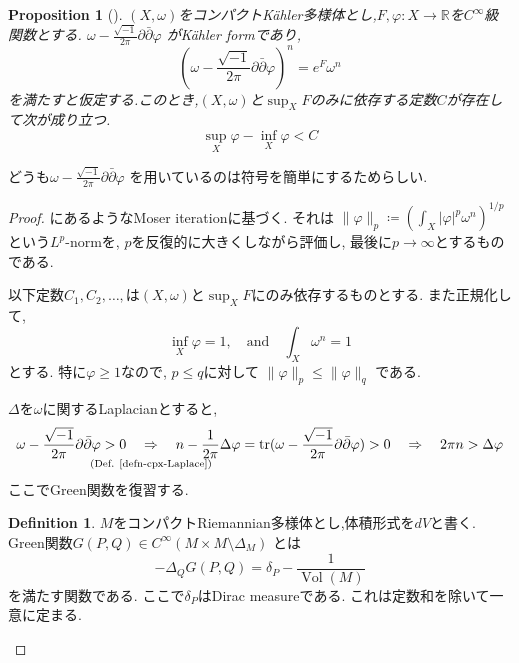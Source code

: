 \documentclass[dvipdfmx,a4paper,11pt]{article} %
\newtheorem{prop}[thm]{Proposition}
\theoremstyle{definition}
\newtheorem{defn}[thm]{Definition}
\theoremstyle{remark}
\numberwithin{equation}{section}
\DeclareMathOperator{\Vol}{Vol}
\newcommand{\underalign}[2]{%
  \quad
  \underset{\mathclap{\raisebox{-1.6ex}{\ensuremath{\scriptstyle #1}}}}{#2}
  \quad
}
\begin{document}
\begin{prop}
[{\cite[Proposition 3.15]{Sze14}}]
$(X,\omega)$をコンパクトK\"ahler多様体とし,$F,\varphi\colon X\to\mathbb{R}$を$C^\infty$級関数とする. $\omega-\frac{\sqrt{-1}}{2\pi}\partial\bar\partial\varphi$
がK\"ahler formであり,
\begin{equation}
\label{eq-Calabi-Yau-eq}
\left(
\omega-\frac{\sqrt{-1}}{2\pi}\partial\bar\partial\varphi
\right)^n
=
e^F\omega^n
\end{equation}
を満たすと仮定する.このとき,$(X,\omega)$と$\sup_XF$のみに依存する定数$C$が存在して次が成り立つ. 
\[
\sup_X\varphi-\inf_X\varphi<C
\]
\end{prop}
どうも\(\omega-\frac{\sqrt{-1}}{2\pi}\partial\bar\partial\varphi
\)
を用いているのは符号を簡単にするためらしい. 
\begin{proof}
\cite[Subsection 3]{Blo07}にあるようなMoser iterationに基づく. それは
\(
\lVert \varphi\rVert_p
\coloneqq 
\left(
\int_X|\varphi|^p\omega^n
\right)^{1/p}
\)
という$L^p$-normを, $p$を反復的に大きくしながら評価し, 最後に$p\to\infty$とするものである.

以下定数$C_1, C_2, \ldots, $は$(X,\omega)$と$\sup_XF$にのみ依存するものとする. 
また正規化して, 
\begin{equation}
\label{eq-normalization-omega}
\inf_X\varphi=1,
\quad \text{and} \quad
\int_X\omega^n=1
\end{equation}
とする. 特に$\varphi\geq1$なので, 
$p\leq q$に対して
\(
\lVert \varphi\rVert_p\leq\lVert \varphi\rVert_q
\)
である. 

$\Delta$を$\omega$に関するLaplacianとすると, 
\begin{equation}
\label{eq-2pin-laplacian}
\omega-\frac{\sqrt{-1}}{2\pi}\partial\bar\partial\varphi>0
\underalign{\text{(Def. \ref{defn-cpx-Laplace})}}{\Rightarrow} 
n-\frac{1}{2\pi}\Delta\varphi
=\operatorname{tr}(\omega-\frac{\sqrt{-1}}{2\pi}\partial\bar\partial\varphi)
>0
\underalign{}{\Rightarrow} 
2\pi n > \Delta\varphi 
\end{equation}
ここでGreen関数を復習する.
\begin{defn}
\(M\)をコンパクトRiemannian多様体とし,体積形式を\(dV\)と書く.
Green関数\(G(P,Q) \in C^{\infty}(M \times M \setminus \Delta_M)\) 
とは
\[
-\Delta_Q G(P,Q)
=
\delta_P-\frac{1}{\Vol(M)}
\]
を満たす関数である. ここで\(\delta_P\)はDirac measureである.
これは定数和を除いて一意に定まる.


\end{defn}
\end{proof}
\end{document}
